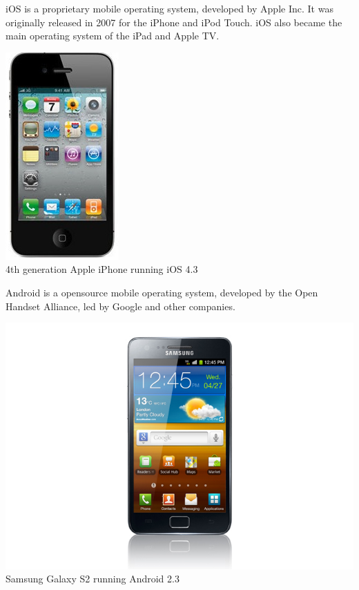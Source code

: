 

iOS is a proprietary mobile operating system, developed by Apple Inc. It was originally released in 2007 for the iPhone and iPod Touch. iOS also became the main operating system of the iPad and Apple TV.

\cite{Sylvain2012}

\begin{centering}
\includegraphics[scale=0.5]{images/iphone4.jpg}\\{4th generation Apple iPhone running iOS 4.3}\\
\end{centering}

Android is a opensource mobile operating system, developed by the Open Handset Alliance, led by Google and other companies.\cite{Inc.2012}

\begin{centering}
\includegraphics[scale=0.35]{images/android_sgs2.jpg}\\{Samsung Galaxy S2 running Android 2.3}\\
\end{centering}


